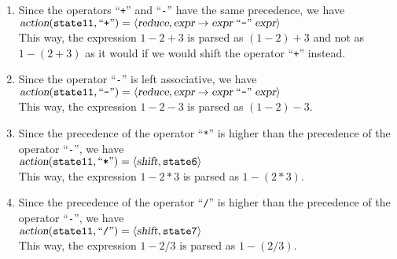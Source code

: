 \begin{enumerate}
\item Since the operators ``\texttt{+}'' and ``\texttt{-}'' have the same precedence, we have 
      \\[0.2cm]
      \hspace*{1.3cm}
      $\textsl{action}(\mathtt{state 11}, \mbox{``\texttt{+}''}) = 
       \langle \textsl{reduce}, \textsl{expr} \rightarrow \textsl{expr} \;\mbox{``\texttt{-}''}\; \textsl{expr} \rangle
      $
      \\[0.2cm]
      This way, the expression $1 - 2 + 3$ is parsed as $(1 - 2) + 3$ and not as $1 - (2 + 3)$ as it would if
      we would shift the operator ``\texttt{+}'' instead.
\item Since the operator ``\texttt{-}'' is left associative, we have 
      \\[0.2cm]
      \hspace*{1.3cm}
      $\textsl{action}(\mathtt{state 11}, \mbox{``\texttt{-}''}) = 
       \langle \textsl{reduce}, \textsl{expr} \rightarrow \textsl{expr} \;\mbox{``\texttt{-}''}\; \textsl{expr} \rangle
      $
      \\[0.2cm]
      This way, the expression $1 - 2 - 3$ is parsed as $(1 - 2) - 3$.
\item Since the precedence of the operator ``\texttt{*}'' is higher than the precedence of the operator
      ``\texttt{-}'', we have  
      \\[0.2cm]
      \hspace*{1.3cm}
      $\textsl{action}(\mathtt{state 11}, \mbox{``\texttt{*}''}) = 
       \langle \textsl{shift}, \mathtt{state6} \rangle
      $
      \\[0.2cm]
      This way, the expression $1 - 2 * 3$ is parsed as $1 - (2 * 3)$.
\item Since the precedence of the operator ``\texttt{/}'' is higher than the precedence of the operator
      ``\texttt{-}'', we have  
      \\[0.2cm]
      \hspace*{1.3cm}
      $\textsl{action}(\mathtt{state 11}, \mbox{``\texttt{/}''}) = 
       \langle \textsl{shift}, \mathtt{state7} \rangle
      $
      \\[0.2cm]
      This way, the expression $1 - 2 / 3$ is parsed as $1 - (2 / 3)$.
\end{enumerate}
\FloatBarrier

